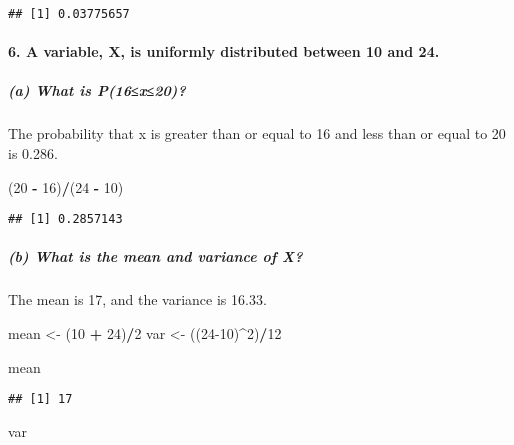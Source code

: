 \documentclass[
]{article}
\newenvironment{Shaded}{\begin{snugshade}}{\end{snugshade}}
\newcommand{\DecValTok}[1]{\textcolor[rgb]{0.00,0.00,0.81}{#1}}
\newcommand{\NormalTok}[1]{#1}
\newcommand{\OtherTok}[1]{\textcolor[rgb]{0.56,0.35,0.01}{#1}}
\newcommand{\SpecialCharTok}[1]{\textcolor[rgb]{0.81,0.36,0.00}{\textbf{#1}}}
\begin{document}
\begin{verbatim}
## [1] 0.03775657
\end{verbatim}

\hypertarget{a-variable-x-is-uniformly-distributed-between-10-and-24.}{%
\paragraph{6. A variable, X, is uniformly distributed between 10 and
24.}\label{a-variable-x-is-uniformly-distributed-between-10-and-24.}}

\hypertarget{a-what-is-p16x20}{%
\subparagraph{(a) What is P(16≤x≤20)?}\label{a-what-is-p16x20}}

The probability that x is greater than or equal to 16 and less than or
equal to 20 is 0.286.

\begin{Shaded}
\begin{Highlighting}[]
\NormalTok{(}\DecValTok{20} \SpecialCharTok{{-}} \DecValTok{16}\NormalTok{)}\SpecialCharTok{/}\NormalTok{(}\DecValTok{24} \SpecialCharTok{{-}} \DecValTok{10}\NormalTok{)}
\end{Highlighting}
\end{Shaded}

\begin{verbatim}
## [1] 0.2857143
\end{verbatim}

\hypertarget{b-what-is-the-mean-and-variance-of-x}{%
\subparagraph{(b) What is the mean and variance of
X?}\label{b-what-is-the-mean-and-variance-of-x}}

The mean is 17, and the variance is 16.33.

\begin{Shaded}
\begin{Highlighting}[]
\NormalTok{mean }\OtherTok{\textless{}{-}}\NormalTok{ (}\DecValTok{10} \SpecialCharTok{+} \DecValTok{24}\NormalTok{)}\SpecialCharTok{/}\DecValTok{2}
\NormalTok{var }\OtherTok{\textless{}{-}}\NormalTok{ ((}\DecValTok{24{-}10}\NormalTok{)}\SpecialCharTok{\^{}}\DecValTok{2}\NormalTok{)}\SpecialCharTok{/}\DecValTok{12}

\NormalTok{mean}
\end{Highlighting}
\end{Shaded}

\begin{verbatim}
## [1] 17
\end{verbatim}

\begin{Shaded}
\begin{Highlighting}[]
\NormalTok{var}
\end{Highlighting}
\end{Shaded}
\end{document}
